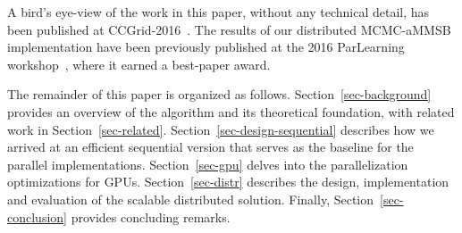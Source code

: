 \begin{comment}
Further, by cataloguing and accounting for the various load and store
operations, we identified the highest priority locations of data reuse. In
order to circumvent the unclear optimization landscape, we developed an
effective kernel code generation mechanism that explores the benefits of
exploiting all permutations of the available optimization opportunities. These
optimizations include caching in shared memory, caching in the register file,
loop unrolling and explicit vectorization.
\end{comment}

A bird's eye-view of the work in this paper, without any technical detail, has been
published at CCGrid-2016~\cite{10.1109/CCGrid.2016.98}.
The results of our distributed MCMC-aMMSB implementation
have been previously published at the 2016 ParLearning
workshop~\cite{DBLP:conf/ipps/El-HelwHLAWB16}, where it earned a best-paper
award.

The remainder of this paper is organized as follows.
Section~\ref{sec-background} provides an overview of the
algorithm and its theoretical foundation, with related work in
Section~\ref{sec-related}. Section~\ref{sec-design-sequential} describes how we
arrived at an efficient sequential version that serves as the baseline for the
parallel implementations. Section~\ref{sec-gpu} delves
into the parallelization optimizations for GPUs.
Section~\ref{sec-distr} describes the design, implementation and evaluation of
the scalable distributed solution. Finally, Section~\ref{sec-conclusion}
provides concluding remarks.






